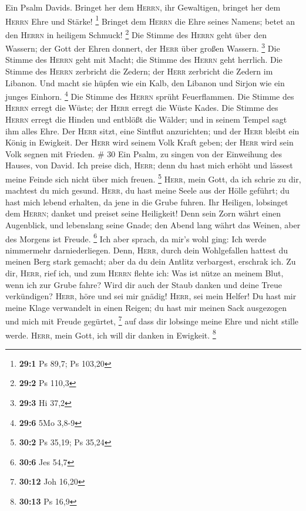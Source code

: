  Ein Psalm Davids. Bringet her dem \textsc{Herrn}, ihr
Gewaltigen, bringet her dem \textsc{Herrn} Ehre und Stärke! \footnote{\textbf{29:1}
  Ps 89,7; Ps 103,20}  Bringet dem \textsc{Herrn} die Ehre
seines Namens; betet an den \textsc{Herrn} in heiligem Schmuck!
\footnote{\textbf{29:2} Ps 110,3}  Die Stimme des
\textsc{Herrn} geht über den Wassern; der Gott der Ehren donnert, der
\textsc{Herr} über großen Wassern. \footnote{\textbf{29:3} Hi 37,2}
 Die Stimme des \textsc{Herrn} geht mit Macht; die Stimme
des \textsc{Herrn} geht herrlich.  Die Stimme des
\textsc{Herrn} zerbricht die Zedern; der \textsc{Herr} zerbricht die
Zedern im Libanon.  Und macht sie hüpfen wie ein Kalb, den
Libanon und Sirjon wie ein junges Einhorn. \footnote{\textbf{29:6} 5Mo
  3,8-9}  Die Stimme des \textsc{Herrn} sprüht
Feuerflammen.  Die Stimme des \textsc{Herrn} erregt die
Wüste; der \textsc{Herr} erregt die Wüste Kades.  Die
Stimme des \textsc{Herrn} erregt die Hinden und entblößt die Wälder; und
in seinem Tempel sagt ihm alles Ehre.  Der \textsc{Herr}
sitzt, eine Sintflut anzurichten; und der \textsc{Herr} bleibt ein König
in Ewigkeit.  Der \textsc{Herr} wird seinem Volk Kraft
geben; der \textsc{Herr} wird sein Volk segnen mit Frieden. \# 30
 Ein Psalm, zu singen von der Einweihung des Hauses, von
David.  Ich preise dich, \textsc{Herr}; denn du hast mich
erhöht und lässest meine Feinde sich nicht über mich freuen. \footnote{\textbf{30:2}
  Ps 35,19; Ps 35,24}  \textsc{Herr}, mein Gott, da ich
schrie zu dir, machtest du mich gesund.  \textsc{Herr}, du
hast meine Seele aus der Hölle geführt; du hast mich lebend erhalten, da
jene in die Grube fuhren.  Ihr Heiligen, lobsinget dem
\textsc{Herrn}; danket und preiset seine Heiligkeit!  Denn
sein Zorn währt einen Augenblick, und lebenslang seine Gnade; den Abend
lang währt das Weinen, aber des Morgens ist Freude. \footnote{\textbf{30:6}
  Jes 54,7}  Ich aber sprach, da mir's wohl ging: Ich
werde nimmermehr darniederliegen.  Denn, \textsc{Herr},
durch dein Wohlgefallen hattest du meinen Berg stark gemacht; aber da du
dein Antlitz verbargest, erschrak ich.  Zu dir,
\textsc{Herr}, rief ich, und zum \textsc{Herrn} flehte ich:
 Was ist nütze an meinem Blut, wenn ich zur Grube fahre?
Wird dir auch der Staub danken und deine Treue verkündigen?
 \textsc{Herr}, höre und sei mir gnädig! \textsc{Herr},
sei mein Helfer!  Du hast mir meine Klage verwandelt in
einen Reigen; du hast mir meinen Sack ausgezogen und mich mit Freude
gegürtet, \footnote{\textbf{30:12} Joh 16,20}  auf dass
dir lobsinge meine Ehre und nicht stille werde. \textsc{Herr}, mein
Gott, ich will dir danken in Ewigkeit. \footnote{\textbf{30:13} Ps 16,9}

